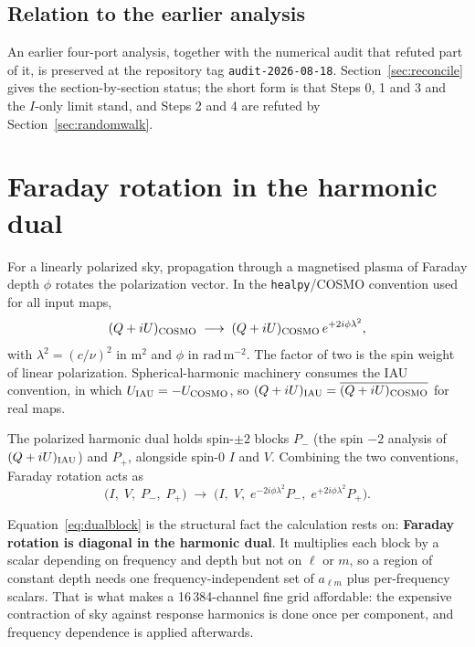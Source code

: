 \documentclass[11pt]{article}
\newcommand{\rmu}{\ensuremath{\mathrm{rad\,m^{-2}}}}
\newcommand{\lamsq}{\ensuremath{\lambda^{2}}}
\newcommand{\code}[1]{\texttt{#1}}
\begin{document}
\subsection{Relation to the earlier analysis}
\label{sec:supersede}

An earlier four-port analysis, together with the numerical audit that
refuted part of it, is preserved at the repository tag
\code{audit-2026-08-18}. Section~\ref{sec:reconcile} gives the
section-by-section status; the short form is that Steps 0, 1 and 3 and
the $I$-only limit stand, and Steps 2 and 4 are refuted by
Section~\ref{sec:randomwalk}.

\section{Faraday rotation in the harmonic dual}
\label{sec:dual}

For a linearly polarized sky, propagation through a magnetised plasma
of Faraday depth $\phi$ rotates the polarization vector. In the
\code{healpy}/COSMO convention used for all input maps,
\begin{equation}
  (Q + iU)_{\rm COSMO} \;\longrightarrow\; (Q + iU)_{\rm COSMO}\,
  e^{+2i\phi\lamsq},
  \label{eq:faraday}
\end{equation}
with $\lamsq = (c/\nu)^2$ in $\mathrm{m^2}$ and $\phi$ in \rmu. The
factor of two is the spin weight of linear polarization.
Spherical-harmonic machinery consumes the IAU convention, in which
$U_{\rm IAU} = -U_{\rm COSMO}$, so $(Q+iU)_{\rm IAU} =
\overline{(Q+iU)_{\rm COSMO}}$ for real maps.

The polarized harmonic dual holds spin-$\pm2$ blocks $P_{-}$ (the spin
$-2$ analysis of $(Q+iU)_{\rm IAU}$) and $P_{+}$, alongside spin-0 $I$
and $V$. Combining the two conventions, Faraday rotation acts as
\begin{equation}
  \bigl(I,\;V,\;P_{-},\;P_{+}\bigr) \;\longrightarrow\;
  \bigl(I,\;V,\;e^{-2i\phi\lamsq}P_{-},\;e^{+2i\phi\lamsq}P_{+}\bigr).
  \label{eq:dualblock}
\end{equation}

Equation~\eqref{eq:dualblock} is the structural fact the calculation
rests on: \textbf{Faraday rotation is diagonal in the harmonic dual}.
It multiplies each block by a scalar depending on frequency and depth
but not on $\ell$ or $m$, so a region of constant depth needs one
frequency-independent set of $a_{\ell m}$ plus per-frequency scalars.
That is what makes a 16\,384-channel fine grid affordable: the
expensive contraction of sky against response harmonics is done once
per component, and frequency dependence is applied afterwards.
\end{document}
